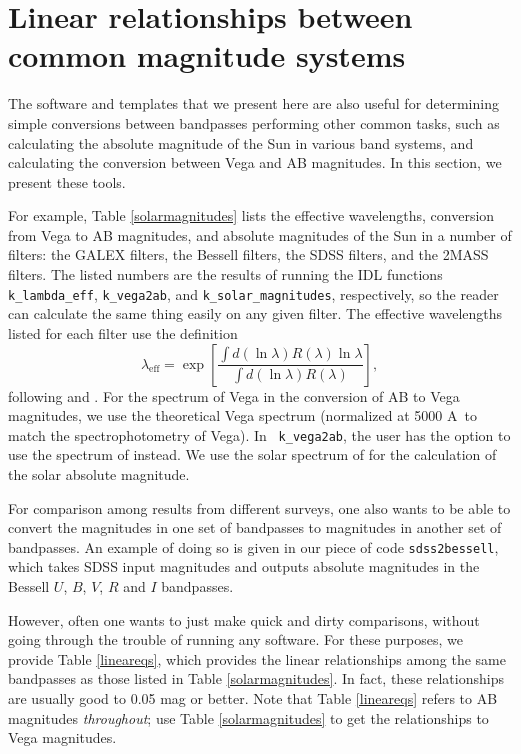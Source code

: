 \documentclass[10pt,preprint]{aastex}
\renewcommand{\AA}{A}
\begin{document}
\section{Linear relationships between common magnitude systems}
\label{sdss2bessell}

The software and templates that we present here are also useful for
determining simple conversions between bandpasses performing other
common tasks, such as calculating the absolute magnitude of the Sun in
various band systems, and calculating the conversion between Vega and
AB magnitudes. In this section, we present these tools.

For example, Table \ref{solarmagnitudes} lists the effective
wavelengths, conversion from Vega to AB magnitudes, and absolute
magnitudes of the Sun in a number of filters: the GALEX filters, the
Bessell filters, the SDSS filters, and the 2MASS filters. The listed
numbers are the results of running the IDL functions {\tt
k\_lambda\_eff}, {\tt k\_vega2ab}, and {\tt k\_solar\_magnitudes},
respectively, so the reader can calculate the same thing easily on any
given filter.  The effective wavelengths listed for each filter use
the definition
\begin{equation}
\label{lden}
\lambda_{\mathrm{eff}} = \exp\left[ 
\frac{\int d(\ln\lambda) R(\lambda) \ln\lambda}
{\int d(\ln\lambda) R(\lambda)} \right],
\end{equation}
following \citet{fukugita96a} and \citet{schneider83a}.  For the
spectrum of Vega in the conversion of AB to Vega magnitudes, we use
the \citet{kurucz91a} theoretical Vega spectrum (normalized at 5000
\AA\ to match the \citet{hayes85a} spectrophotometry of Vega). In {\tt
k\_vega2ab}, the user has the option to use the spectrum of
\citet{hayes85a} instead.  We use the solar spectrum of
\citet{kurucz91a} for the calculation of the solar absolute magnitude.

For comparison among results from different surveys, one also wants to
be able to convert the magnitudes in one set of bandpasses to
magnitudes in another set of bandpasses. An example of doing so is
given in our piece of code {\tt sdss2bessell}, which takes SDSS input
magnitudes and outputs absolute magnitudes in the Bessell $U$, $B$,
$V$, $R$ and $I$ bandpasses. 

However, often one wants to just make quick and dirty comparisons,
without going through the trouble of running any software. For these
purposes, we provide Table \ref{lineareqs}, which provides the linear
relationships among the same bandpasses as those listed in Table
\ref{solarmagnitudes}. In fact, these relationships are usually good
to 0.05 mag or better. Note that Table \ref{lineareqs} refers to AB
magnitudes {\it throughout}; use Table \ref{solarmagnitudes} to get
the relationships to Vega magnitudes.
\end{document}
